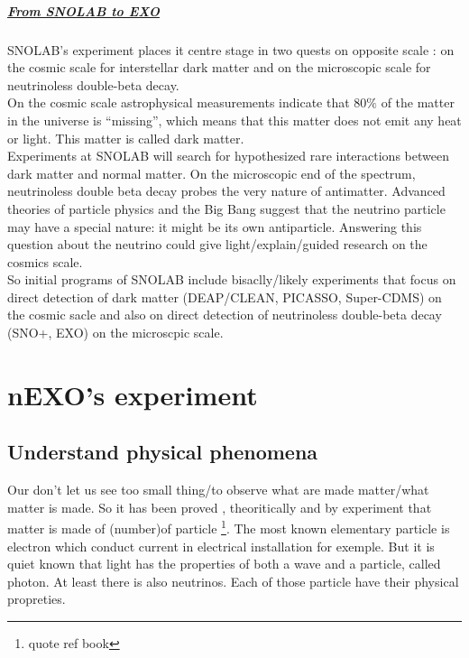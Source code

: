 \documentclass[a4paper, 11pt]{report}%
\begin{document}
  \paragraph{\underline{\emph{From SNOLAB to EXO}}}
  
  SNOLAB’s experiment places it centre stage in two quests on opposite scale : on the cosmic scale for interstellar dark matter and on the 
  microscopic scale for neutrinoless double-beta decay. 
  \\
  
  On the cosmic scale astrophysical measurements indicate that $80\%$ of the matter in the universe is ``missing'', which means
  that this matter does not emit any heat or light. This matter is called dark matter.\\
  Experiments at SNOLAB will search for hypothesized rare interactions between dark matter and normal matter. On the microscopic end of 
  the spectrum, neutrinoless double beta decay probes the very nature of antimatter. 
  Advanced theories of particle physics and the Big Bang suggest that the neutrino particle may have a special nature: it might be its own antiparticle. 
  Answering this question about the neutrino could give light/explain/guided research on the cosmics scale. 
  \\
  
  So initial programs of SNOLAB include bisaclly/likely experiments that focus on direct detection of dark matter (DEAP/CLEAN, PICASSO, 
  Super-CDMS) on the cosmic sacle and also on direct detection of neutrinoless double-beta decay (SNO+, EXO) on the microscpic scale. 
   
  
  

\chapter{nEXO's experiment} %
 

  \section{Understand physical phenomena}%
  
  Our don't let us see too small thing/to observe what are made matter/what matter is made. So it has been proved , theoritically and by experiment that matter is made of (number)of particle \footnote{quote ref book}. The most known elementary particle is electron which conduct current in 
  electrical installation for exemple. But it is quiet known that light has the properties of both a wave and a particle, called photon. 
  At least there is also
  neutrinos. Each of those particle have their physical propreties.
  \\
  
\end{document}

